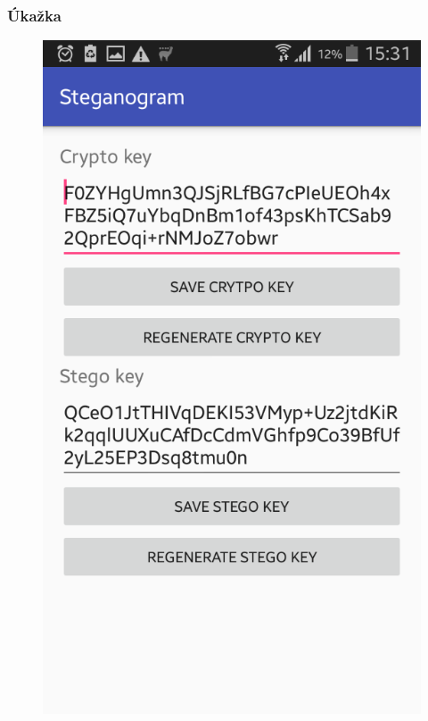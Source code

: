 \documentclass{beamer}
\begin{document}
\begin{frame}
    \frametitle{Úkažka}
    \begin{figure}
    \centerline{\includegraphics[height=0.8 \textheight]{images/screen_8.png}}
    \end{figure}
\end{frame}
\end{document}

